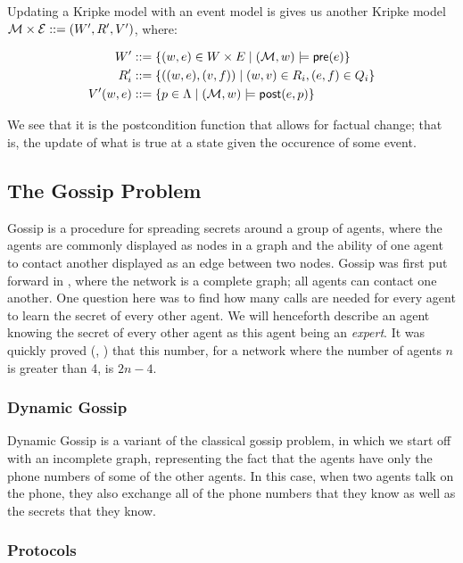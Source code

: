 \documentclass[12pt, a4paper]{article}
\begin{document}
Updating a Kripke model  with an event model  is gives us another
Kripke model $\mathcal{M} \times \mathcal{E} ::= (W', R', V')$, where:

\begin{align*}
  W'   &::= \left\{(w, e) \in W \times E \mid (\mathcal{M}, w) \models \textsf{pre}(e)\right\} \\
  R_i' &::= \left\{((w, e), (v, f)) \mid (w, v) \in R_i, (e, f) \in Q_i \right\} \\
  V'(w, e) &::= \left\{ p \in \Lambda \mid (\mathcal{M}, w) \models \textsf{post}(e, p) \right\}
\end{align*}

We see that it is the postcondition function that allows for factual change;
that is, the update of what is true at a state given the occurence of some
event. 

\subsection{The Gossip Problem}

Gossip is a procedure for spreading secrets around a group of agents, where the
agents are commonly displayed as nodes in a graph and the ability of one agent
to contact another displayed as an edge between two nodes. Gossip was first put
forward in \cite{Tijdeman:1971}, where the network is a complete graph; all
agents can contact one another. One question here was to find how many calls are
needed for every agent to learn the secret of every other agent. We will
henceforth describe an agent knowing the secret of every other agent as this
agent being an \textit{expert}. It was quickly proved (\cite{TelephoneDisease},
\cite{GandT}) that this number, for a network where the number of agents $n$ is
greater than 4, is $2n - 4$.
 
\subsubsection{Dynamic Gossip}

Dynamic Gossip is a variant of the classical gossip problem, in which we start
off with an incomplete graph, representing the fact that the agents have only
the phone numbers of some of the other agents. In this case, when two agents
talk on the phone, they also exchange all of the phone numbers that they know as
well as the secrets that they know.

\subsubsection{Protocols}
\end{document}
